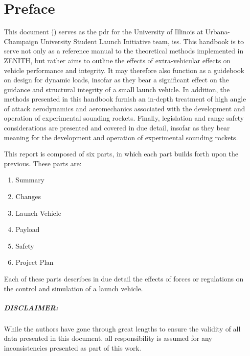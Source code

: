\chapter{Preface}
	
This document (\texttt{\docno}) serves as the \gls{pdr} for the University of Illinois at Urbana-Champaign University Student Launch Initiative team, \gls{iss}. This handbook is to serve not only as a reference manual to the theoretical methods implemented in ZENITH, but rather aims to outline the effects of extra-vehicular effects on vehicle performance and integrity. It may therefore also function as a guidebook on design for dynamic loads, insofar as they bear a significant effect on the guidance and structural integrity of a small launch vehicle. In addition, the methods presented in this handbook furnish an in-depth treatment of high angle of attack aerodynamics and aeromechanics associated with the development and operation of experimental sounding rockets. Finally, legislation and range safety considerations are presented and covered in due detail, insofar as they bear meaning for the development and operation of experimental sounding rockets.

This report is composed of six parts, in which each part builds forth upon the previous. These parts are:

\begin{enumerate}[noitemsep, label=\Roman*]
	\item Summary
	\item Changes
	\item Launch Vehicle
	\item Payload
	\item Safety
	\item Project Plan
\end{enumerate}

Each of these parts describes in due detail the effects of forces or regulations on the control and simulation of a launch vehicle.

\paragraph{DISCLAIMER:}
While the authors have gone through great lengths to ensure the validity of all data presented in this document, all responsibility is assumed for any inconsistencies presented as part of this work. 